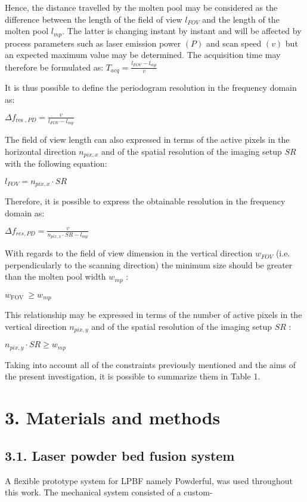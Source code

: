 \documentclass[10pt]{article}
\begin{document}
Hence, the distance travelled by the molten pool may be considered as the difference between the length of the field of view $l_{F O V}$ and the length of the molten pool $l_{m p}$. The latter is changing instant by instant and will be affected by process parameters such as laser emission power $(P)$ and scan speed $(v)$ but an expected maximum value may be determined. The acquisition time may therefore be formulated as: $T_{a c q}=\frac{l_{F O V}-l_{m p}}{v}$

It is thus possible to define the periodogram resolution in the frequency domain as:

$\Delta f_{\text {res }, P D}=\frac{v}{l_{F O V}-l_{m p}}$

The field of view length can also expressed in terms of the active pixels in the horizontal direction $n_{p i x, x}$ and of the spatial resolution of the imaging setup $S R$ with the following equation:

$l_{F O V}=n_{p i x, x} \cdot S R$

Therefore, it is possible to express the obtainable resolution in the frequency domain as:

$\Delta f_{r e s, P D}=\frac{v}{n_{p i x, x} \cdot S R-l_{m p}}$

With regards to the field of view dimension in the vertical direction $w_{F O V}$ (i.e. perpendicularly to the scanning direction) the minimum size should be greater than the molten pool width $w_{m p}$ :

$w_{\text {FOV }} \geq w_{m p}$

This relationship may be expressed in terms of the number of active pixels in the vertical direction $n_{p i x, y}$ and of the spatial resolution of the imaging setup $S R$ :

$n_{p i x, y} \cdot S R \geq w_{m p}$

Taking into account all of the constraints previously mentioned and the aims of the present investigation, it is possible to summarize them in Table 1.

\section*{3. Materials and methods}
\subsection*{3.1. Laser powder bed fusion system}
A flexible prototype system for LPBF namely Powderful, was used throughout this work. The mechanical system consisted of a custom-
\end{document}
